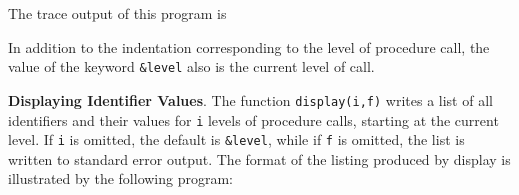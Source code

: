 The trace output of this program is



In addition to the indentation corresponding to the level of procedure
call, the value of the keyword \texttt{\&level} also is the current
level of call.

\textbf{Displaying Identifier Values}. The function
\texttt{display(i,f)} writes a list of all identifiers and their
values for \texttt{i} levels of procedure calls, starting at the
current level. If \texttt{i} is omitted, the default is
\texttt{\&level}, while if \texttt{f} is omitted, the list is written
to standard error output. The format of the listing produced by
display is illustrated by the following program:




